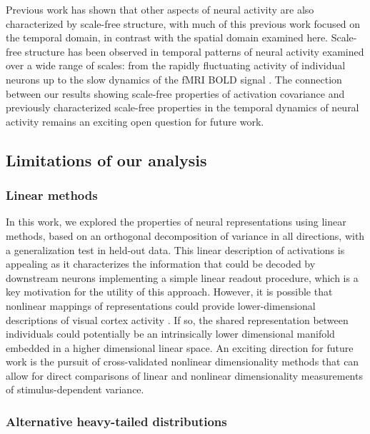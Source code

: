 \documentclass[10pt]{article}
\begin{document}
Previous work has shown that other aspects of neural activity are also characterized by scale-free structure, with much of this previous work focused on the temporal domain, in contrast with the spatial domain examined here. Scale-free structure has been observed in temporal patterns of neural activity examined over a wide range of scales: from the rapidly fluctuating activity of individual neurons up to the slow dynamics of the fMRI BOLD signal \autocite{He2010,Werner2010,Ciuciu2012,Boonstra2013,He2014}. The connection between our results showing scale-free properties of activation covariance and previously characterized scale-free properties in the temporal dynamics of neural activity remains an exciting open question for future work.

\subsection{Limitations of our analysis}\label{limitations-of-our-analysis}

\subsubsection{Linear methods}\label{linear-methods}

In this work, we explored the properties of neural representations using linear methods, based on an orthogonal decomposition of variance in all directions, with a generalization test in held-out data. This linear description of activations is appealing as it characterizes the information that could be decoded by downstream neurons implementing a simple linear readout procedure, which is a key motivation for the utility of this approach. However, it is possible that nonlinear mappings of representations could provide lower-dimensional descriptions of visual cortex activity \autocite{Ansuini2019,De2023,Jazayeri2021}. If so, the shared representation between individuals could potentially be an intrinsically lower dimensional manifold embedded in a higher dimensional linear space. An exciting direction for future work is the pursuit of cross-validated nonlinear dimensionality methods that can allow for direct comparisons of linear and nonlinear dimensionality measurements of stimulus-dependent variance.

\subsubsection{Alternative heavy-tailed distributions}\label{alternative-heavy-tailed-distributions}
\end{document}
